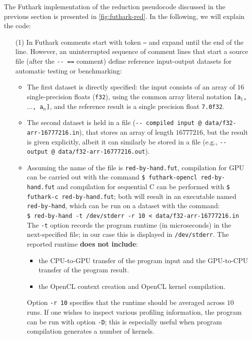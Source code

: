 \documentclass[acmsmall,review]{acmart}\settopmatter{printfolios=true,printccs=false,printacmref=false}
\begin{document}
The Futhark implementation of the reduction pseudocode discussed
in the previous section is presented in \cref{fig:futhark-red}.
In the following, we will explain the code:
\begin{itemize}
    \item[(1)] In Futhark comments start with token {\tt --} and expand
            until the end of the line. However, an uninterrupted 
            sequence of comment lines that start a source file 
            (after the \lstinline{-- ==} comment) define 
            reference input-output datasets for automatic testing
            or benchmarking:

        \begin{itemize}
            \item The first dataset is directly specified:
            the input consists of an array of $16$ single-precision
            floats (\lstinline{f32}), using the common array literal 
            notation {\tt [a$_1$, $\ldots$, a$_n$]}, and the reference
            result is a single precision float {\tt 7.0f32}.

            \item The second dataset is held in a file 
            (\lstinline{-- compiled input @ data/f32-arr-16777216.in}),
            that stores an array of length $16777216$, but the result
            is given explicitly, albeit it can similarly be stored in
            a file (e.g., \lstinline{-- output @ data/f32-arr-16777216.out}).

            \item Assuming the name of the file is {\tt red-by-hand.fut},
                  compilation for GPU can be carried out with the command
            {\tt \$ futhark-opencl red-by-hand.fut} and compilation for
                  sequential C can be performed with  
            {\tt \$ futhark-c red-by-hand.fut}; both will result in an executable
            named {\tt red-by-hand}, which can be run on a dataset with the
            command:\\ 
            {\tt \$ red-by-hand -t /dev/stderr -r 10 < data/f32-arr-16777216.in}\\
            The {\tt -t} option records the program runtime (in microseconds)
            in the next-specified file; in our case this is displayed 
            in {\tt /dev/stderr}. The reported runtime {\bf does not include}:
            \begin{itemize} 
               \item the CPU-to-GPU transfer of the program input and the
            GPU-to-CPU transfer of the program result. 
               \item the OpenCL context creation and OpenCL kernel compilation.
            \end{itemize}
            Option {\tt -r 10} specifies that the runtime should be averaged
                across $10$ runs.
            If one wishes to inspect various profiling information, the
            program can be run with option {\tt -D}; this is especially
            useful when program compilation generates a number of kernels.


\end{itemize}
\end{itemize}
\end{document}
